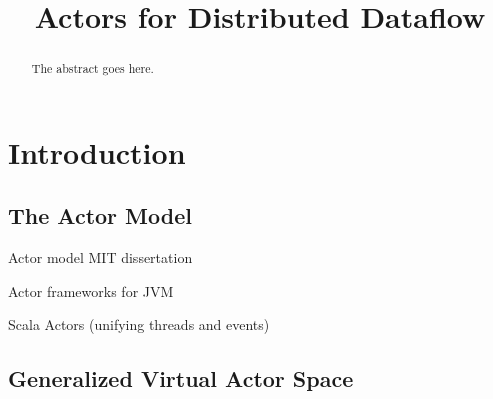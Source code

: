\documentclass[conference]{IEEEtran}
\begin{document}
\title{Actors for Distributed Dataflow}


\author{

    \and

    \and
    }

\maketitle

\begin{abstract}
The abstract goes here.
\end{abstract}



\section{Introduction}

\subsection{The Actor Model}

Actor model MIT dissertation \cite{hewitt1977viewing, agha_actors:_1985}

Actor frameworks for JVM \cite{karmani_actor_2009}

Scala Actors (unifying threads and events) \cite{haller_scala_2009}

\subsection{Generalized Virtual Actor Space}
\end{document}
